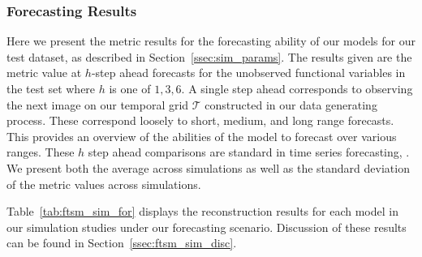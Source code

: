 \subsubsection{Forecasting Results}
Here we present the metric results for the forecasting ability of our models for our test dataset, as described in Section~\ref{ssec:sim_params}.
The results given are the metric value at $h$-step ahead forecasts for the unobserved functional variables in the test set where $h$ is one of $1, 3, 6$.
A single step ahead corresponds to observing the next image on our temporal grid $\mathcal{T}$ constructed in our data generating process. 
These correspond loosely to short, medium, and long range forecasts. 
This provides an overview of the abilities of the model to forecast over various ranges.
These $h$ step ahead comparisons are standard in time series forecasting, \citep{hyndman_forecasting_2021}. 
We present both the average across simulations as well as the standard deviation of the metric values across simulations.

Table~\ref{tab:ftsm_sim_for} displays the reconstruction results for each model in our simulation studies under our forecasting scenario. 
Discussion of these results can be found in Section~\ref{ssec:ftsm_sim_disc}. 

